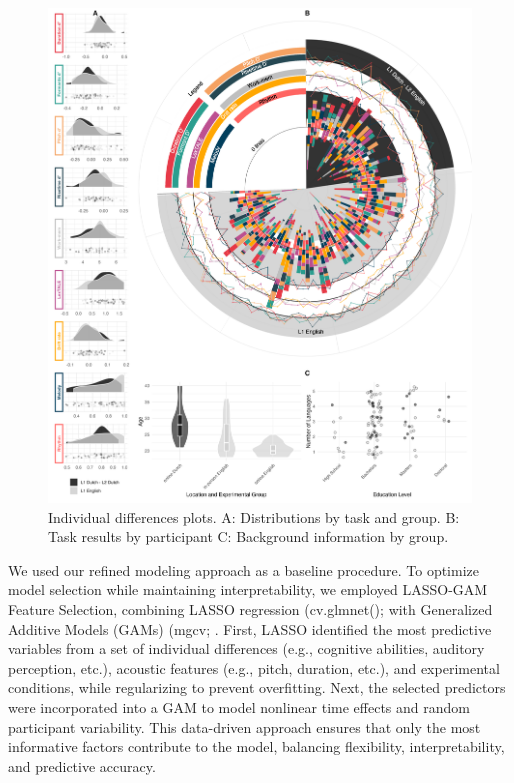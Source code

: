 \begin{figure}[H]  %
    \centering
    \includegraphics[width=\textwidth,height=\textheight,keepaspectratio]{viz/combined_plot_circle.png}
    \caption{Individual differences plots. A: Distributions by task and group. B: Task results by participant C: Background information by group.}
    \label{fig:combined_plot}
\end{figure}
\clearpage


We used our refined modeling approach as a baseline procedure. To optimize model selection while maintaining interpretability, we employed LASSO-GAM Feature Selection, combining LASSO regression (cv.glmnet(); \parencite{Friedman2010} with Generalized Additive Models (GAMs) (mgcv; \parencite{Wood2017}. First, LASSO identified the most predictive variables from a set of individual differences (e.g., cognitive abilities, auditory perception, etc.), acoustic features (e.g., pitch, duration, etc.), and experimental conditions, while regularizing to prevent overfitting. Next, the selected predictors were incorporated into a GAM to model nonlinear time effects and random participant variability. This data-driven approach ensures that only the most informative factors contribute to the model, balancing flexibility, interpretability, and predictive accuracy.

